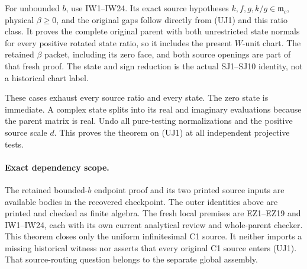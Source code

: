 For unbounded $b$, use IW1--IW24. Its exact source hypotheses
$k,f,g,k/g\in\mathfrak m_c$, physical $\beta\geq0$, and the
original gaps follow directly from (UJ1) and this ratio class.
It proves the complete original parent with both unrestricted
state normals for every positive rotated state ratio, so it
includes the present $W$-unit chart. The retained $\beta$ packet,
including its zero face, and both source openings are part of
that fresh proof. The state and sign reduction is the actual
SJ1--SJ10 identity, not a historical chart label.

These cases exhaust every source ratio and every state.
The zero state is immediate. A complex state splits into its
real and imaginary evaluations because the parent matrix is real.
Undo all pure-testing normalizations and the positive source
scale $d$. This proves the theorem on (UJ1) at all independent
projective tests.

\paragraph{Exact dependency scope.}
The retained bounded-$b$ endpoint proof and its two printed source
inputs are available bodies in the recovered checkpoint. The
outer identities above are printed and checked as finite algebra.
The fresh local premises are EZ1--EZ19 and IW1--IW24, each with
its own current analytical review and whole-parent checker.
This theorem closes only the uniform infinitesimal C1 source.
It neither imports a missing historical witness nor asserts that
every original C1 source enters (UJ1). That source-routing
question belongs to the separate global assembly.
